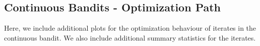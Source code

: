 \documentclass{article}
\begin{document}
\subsection{Continuous Bandits - Optimization Path}
Here, we include additional plots for the optimization behaviour of iterates in the continuous bandit. We also include additional summary statistics for the iterates. 

  
  
\end{document}
